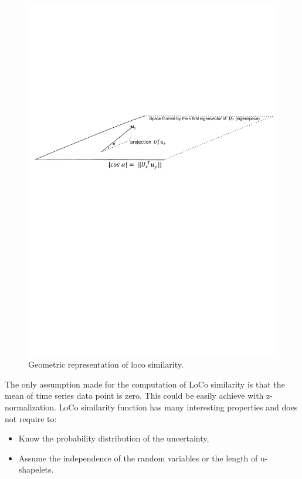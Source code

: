 \begin{figure}[h]
\centering
 \includegraphics[scale=0.70]{images/loco2}
\caption{Geometric representation of loco similarity.}
\label{geoLoco}
\end{figure}



The only assumption made for the computation of LoCo similarity is that the mean of time
series data point is zero. This could be easily achieve with z-normalization.
LoCo similarity function has many interesting properties and does not require to:
\begin{itemize}
  \item  Know the probability distribution of the uncertainty,
  \item Assume the independence of the random variables or the length of
  u-shapelets.
\end{itemize}

